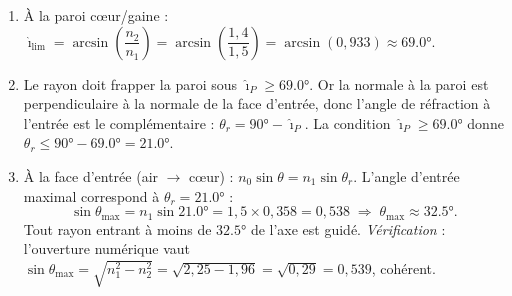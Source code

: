 \documentclass[11pt,a4paper]{article}
\begin{document}
\begin{corrige}
\begin{enumerate}[label=\alph*)]
  \item À la paroi c\oe ur/gaine : $\hat{\imath}_{\text{lim}}=\arcsin\!\left(\dfrac{n_2}{n_1}\right)
        =\arcsin\!\left(\dfrac{1{,}4}{1{,}5}\right)=\arcsin(0{,}933)\approx\ang{69.0}$.
  \item Le rayon doit frapper la paroi sous $\hat{\imath}_P\ge\ang{69.0}$. Or la normale à la paroi
        est perpendiculaire à la normale de la face d'entrée, donc l'angle de réfraction à l'entrée
        est le complémentaire : $\theta_r=\ang{90}-\hat{\imath}_P$. La condition
        $\hat{\imath}_P\ge\ang{69.0}$ donne $\theta_r\le\ang{90}-\ang{69.0}=\ang{21.0}$.
  \item À la face d'entrée (air $\to$ c\oe ur) : $n_0\sin\theta=n_1\sin\theta_r$. L'angle d'entrée
        maximal correspond à $\theta_r=\ang{21.0}$ :
        \[ \sin\theta_{\max}=n_1\sin\ang{21.0}=1{,}5\times0{,}358=0{,}538
           \;\Longrightarrow\;\boxed{\theta_{\max}\approx\ang{32.5}}. \]
        Tout rayon entrant à moins de $\ang{32.5}$ de l'axe est guidé. \emph{Vérification} :
        l'ouverture numérique vaut $\sin\theta_{\max}=\sqrt{n_1^2-n_2^2}=\sqrt{2{,}25-1{,}96}=\sqrt{0{,}29}
        =0{,}539$, cohérent.
\end{enumerate}
\end{corrige}
\end{document}
